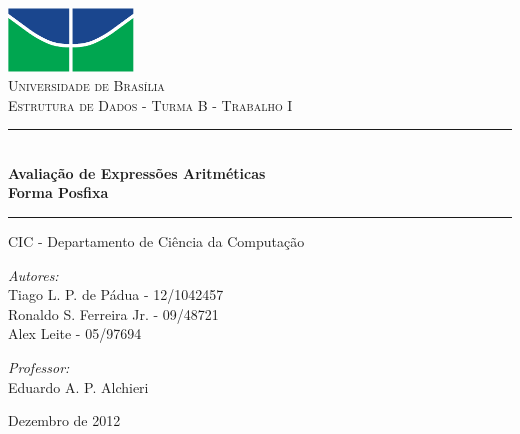 \documentclass[a4paper,11pt]{article}
\newcommand{\HRule}{\rule{\linewidth}{0.5mm}}
\begin{document}
\begin{titlepage}
\begin{center}
 
\includegraphics[width=0.25\textwidth]{./unb.pdf}\\[1cm]
 
\textsc{\LARGE Universidade de Brasília}\\[1.5cm]
 
\textsc{\Large Estrutura de Dados - Turma B - Trabalho I}\\[0.5cm]
 
\HRule \\[0.4cm]
{ \huge \bfseries Avaliação de Expressões Aritméticas\\Forma Posfixa}
\HRule
\vspace{0.75cm}
\large CIC - Departamento de Ciência da Computação\\
\vspace{0.8cm}
\begin{minipage}{0.4\textwidth}
\begin{flushleft} \large
\emph{Autores:}\\
Tiago L. P. de Pádua - 12/1042457\\
Ronaldo S. Ferreira Jr. - 09/48721\\
Alex Leite - 05/97694\\
\end{flushleft}
\end{minipage}
\begin{minipage}{0.4\textwidth}
\begin{flushright} \large
\emph{Professor:} \\
Eduardo A. P. Alchieri
\end{flushright}
\end{minipage}
 
\vfill
 
{\large Dezembro de 2012}
\end{center}
\end{titlepage}

\pagestyle{plain}

\end{document}

